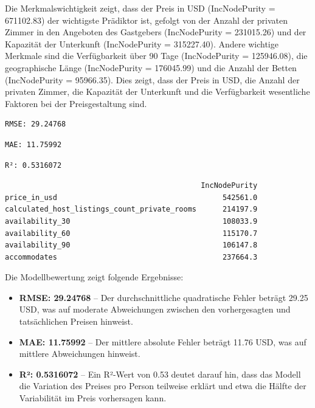 \documentclass[
  journal,
]{IEEEtran}%
\begin{document}
Die Merkmalswichtigkeit zeigt, dass der Preis in USD (IncNodePurity =
671102.83) der wichtigste Prädiktor ist, gefolgt von der Anzahl der
privaten Zimmer in den Angeboten des Gastgebers (IncNodePurity =
231015.26) und der Kapazität der Unterkunft (IncNodePurity = 315227.40).
Andere wichtige Merkmale sind die Verfügbarkeit über 90 Tage
(IncNodePurity = 125946.08), die geographische Länge (IncNodePurity =
176045.99) und die Anzahl der Betten (IncNodePurity = 95966.35). Dies
zeigt, dass der Preis in USD, die Anzahl der privaten Zimmer, die
Kapazität der Unterkunft und die Verfügbarkeit wesentliche Faktoren bei
der Preisgestaltung sind.

\begin{verbatim}
RMSE: 29.24768 
\end{verbatim}

\begin{verbatim}
MAE: 11.75992 
\end{verbatim}

\begin{verbatim}
R²: 0.5316072 
\end{verbatim}

\begin{verbatim}
                                             IncNodePurity
price_in_usd                                      542561.0
calculated_host_listings_count_private_rooms      214197.9
availability_30                                   108033.9
availability_60                                   115170.7
availability_90                                   106147.8
accommodates                                      237664.3
\end{verbatim}

Die Modellbewertung zeigt folgende Ergebnisse:

\begin{itemize}
\item
  \textbf{RMSE: 29.24768} -- Der durchschnittliche quadratische Fehler
  beträgt 29.25 USD, was auf moderate Abweichungen zwischen den
  vorhergesagten und tatsächlichen Preisen hinweist.
\item
  \textbf{MAE: 11.75992} -- Der mittlere absolute Fehler beträgt 11.76
  USD, was auf mittlere Abweichungen hinweist.
\item
  \textbf{R²: 0.5316072} -- Ein R²-Wert von 0.53 deutet darauf hin, dass
  das Modell die Variation des Preises pro Person teilweise erklärt und
  etwa die Hälfte der Variabilität im Preis vorhersagen kann.
\end{itemize}
\end{document}
